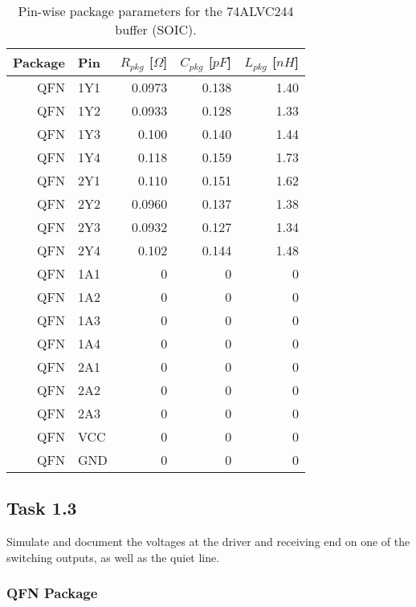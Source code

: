 \documentclass[../main.tex]{subfiles}
\begin{document}
\begin{table}[h]
    \centering
    \begin{tabular}{r|l r r r}
        \toprule[1pt]
        \textbf{Package} & \textbf{Pin} & $R_{pkg}$ [$\si{\Omega}$] & $C_{pkg}$ [$\si{pF}$] & $L_{pkg}$ [$\si{nH}$] \\
        \midrule
        QFN  & 1Y1  & 0.0973 & 0.138 & 1.40 \\
        QFN  & 1Y2  & 0.0933 & 0.128 & 1.33 \\
        QFN  & 1Y3  & 0.100  & 0.140 & 1.44 \\
        QFN  & 1Y4  & 0.118  & 0.159 & 1.73 \\
        QFN  & 2Y1  & 0.110  & 0.151 & 1.62 \\
        QFN  & 2Y2  & 0.0960 & 0.137 & 1.38 \\
        QFN  & 2Y3  & 0.0932 & 0.127 & 1.34 \\
        QFN  & 2Y4  & 0.102  & 0.144 & 1.48 \\
        \midrule
        QFN  & 1A1  & 0 & 0 & 0 \\
        QFN  & 1A2  & 0 & 0 & 0 \\
        QFN  & 1A3  & 0 & 0 & 0 \\
        QFN  & 1A4  & 0 & 0 & 0 \\
        QFN  & 2A1  & 0 & 0 & 0 \\
        QFN  & 2A2  & 0 & 0 & 0 \\
        QFN  & 2A3  & 0 & 0 & 0 \\
        QFN  & VCC  & 0 & 0 & 0 \\
        QFN  & GND  & 0 & 0 & 0 \\
        \bottomrule[1pt]
    \end{tabular}
    \caption{Pin-wise package parameters for the 74ALVC244 buffer (SOIC).}
\end{table}

\newpage

\subsection{Task 1.3}

Simulate and document the voltages at the driver and receiving end on one of the switching outputs, as well as the quiet line.

\subsubsection{QFN Package}
\end{document}
